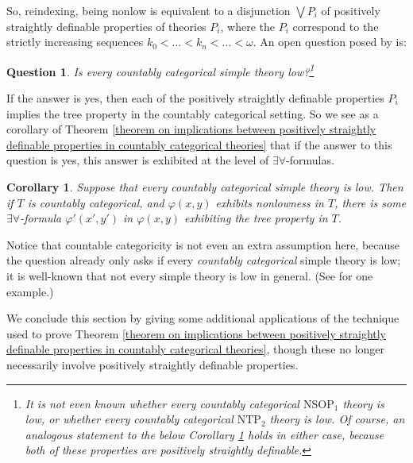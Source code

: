 \documentclass[10pt,a4paper]{amsart}
\newtheorem{question}{Question}
\newtheorem{corollary}{Corollary}
\begin{document}
So, reindexing, being nonlow is equivalent to a disjunction $\bigvee P_{i}$ of positively straightly definable properties of theories $P_{i}$, where the $P_{i}$ correspond to the strictly increasing sequences $k_{0} < \ldots < k_{n} < \ldots < \omega$. An open question posed by \cite{palacin2012omega} is:

\begin{question}
Is every countably categorical simple theory low?\footnote{It is not even known whether every countably categorical $\mathrm{NSOP}_{1}$ theory is low, or whether every countably categorical $\mathrm{NTP}_{2}$ theory is low. Of course, an analogous statement to the below Corollary \ref{ea-tree for countably categorical nonlow} holds in either case, because both of these properties are positively straightly definable. }
\end{question}

If the answer is yes, then each of the positively straightly definable properties $P_{i}$ implies the tree property in the countably categorical setting. So we see as a corollary of Theorem \ref{theorem on implications between positively straightly definable properties in countably categorical theories} that if the answer to this question is yes, this answer is exhibited at the level of $\exists\forall$-formulas.


\begin{corollary}\label{ea-tree for countably categorical nonlow}
Suppose that every countably categorical simple theory is low. Then if $T$ is countably categorical, and $\varphi(x, y)$ exhibits nonlowness in $T$, there is some $\exists\forall$-formula $\varphi'(x', y')$ in $\varphi(x, y)$ exhibiting the tree property in $T$.    
\end{corollary}

Notice that countable categoricity is not even an extra assumption here, because the question already only asks if every \textit{countably categorical} simple theory is low; it is well-known that not every simple theory is low in general. (See \cite{CasanovasKim1998} for one example.)

We conclude this section by giving some additional applications of the technique used to prove Theorem \ref{theorem on implications between positively straightly definable properties in countably categorical theories}, though these no longer necessarily involve positively straightly definable properties.
\end{document}
